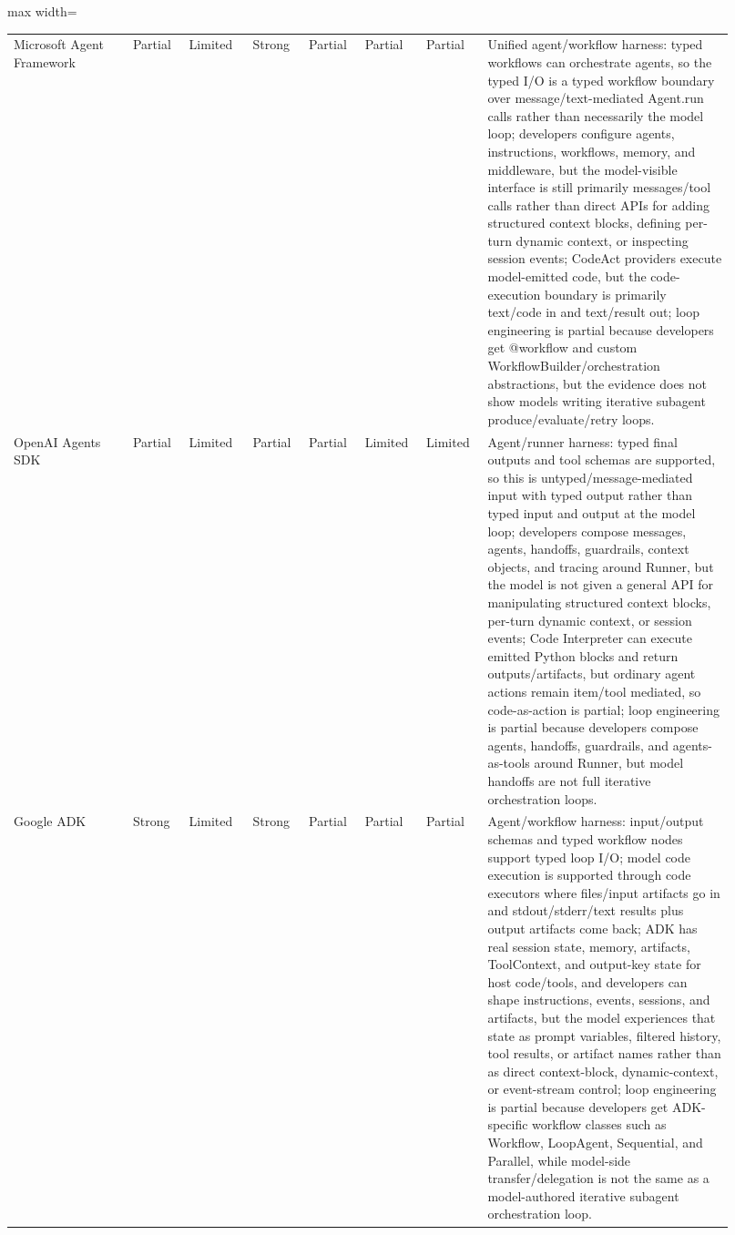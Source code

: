 \documentclass[11pt, logo, onecolumn, copyright, colorlinks=true, allcolors=blue]{nvidiatechreport}
\begin{document}
\begin{landscape}
\begin{table}[p]
\begin{adjustbox}{max width=\linewidth}
\begin{tabular}{p{0.15\linewidth}p{0.075\linewidth}p{0.085\linewidth}p{0.075\linewidth}p{0.075\linewidth}p{0.075\linewidth}p{0.075\linewidth}p{0.31\linewidth}}
Microsoft Agent Framework & Partial & Limited & Strong & Partial & Partial & Partial & Unified agent/workflow harness: typed workflows can orchestrate agents, so the typed I/O is a typed workflow boundary over message/text-mediated Agent.run calls rather than necessarily the model loop; developers configure agents, instructions, workflows, memory, and middleware, but the model-visible interface is still primarily messages/tool calls rather than direct APIs for adding structured context blocks, defining per-turn dynamic context, or inspecting session events; CodeAct providers execute model-emitted code, but the code-execution boundary is primarily text/code in and text/result out; loop engineering is partial because developers get @workflow and custom WorkflowBuilder/orchestration abstractions, but the evidence does not show models writing iterative subagent produce/evaluate/retry loops. \\
OpenAI Agents SDK & Partial & Limited & Partial & Partial & Limited & Limited & Agent/runner harness: typed final outputs and tool schemas are supported, so this is untyped/message-mediated input with typed output rather than typed input and output at the model loop; developers compose messages, agents, handoffs, guardrails, context objects, and tracing around Runner, but the model is not given a general API for manipulating structured context blocks, per-turn dynamic context, or session events; Code Interpreter can execute emitted Python blocks and return outputs/artifacts, but ordinary agent actions remain item/tool mediated, so code-as-action is partial; loop engineering is partial because developers compose agents, handoffs, guardrails, and agents-as-tools around Runner, but model handoffs are not full iterative orchestration loops. \\
Google ADK & Strong & Limited & Strong & Partial & Partial & Partial & Agent/workflow harness: input/output schemas and typed workflow nodes support typed loop I/O; model code execution is supported through code executors where files/input artifacts go in and stdout/stderr/text results plus output artifacts come back; ADK has real session state, memory, artifacts, ToolContext, and output-key state for host code/tools, and developers can shape instructions, events, sessions, and artifacts, but the model experiences that state as prompt variables, filtered history, tool results, or artifact names rather than as direct context-block, dynamic-context, or event-stream control; loop engineering is partial because developers get ADK-specific workflow classes such as Workflow, LoopAgent, Sequential, and Parallel, while model-side transfer/delegation is not the same as a model-authored iterative subagent orchestration loop. \\

\end{tabular}
\end{adjustbox}
\end{table}
\end{landscape}
\end{document}
